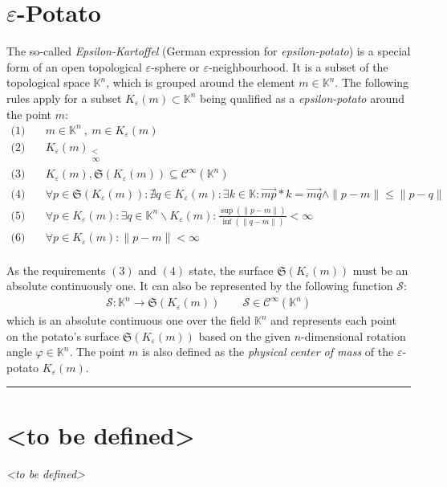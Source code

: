 \documentclass[pdftex,12pt,a4paper]{report}
\begin{document}
    \section{$ \varepsilon $-Potato}
    The so-called \emph{Epsilon-Kartoffel} (German expression for \emph{epsilon-potato}) is a special form of an open topological $\varepsilon$-sphere or $\varepsilon$-neighbourhood. It is a subset of the topological space $ \mathbb{K}^n $, which is grouped around the element $ m \in \mathbb{K}^n $. The following rules apply for a subset $ K_{\varepsilon}(m) \subset \mathbb{K}^n $ being qualified as a \emph{epsilon-potato} around the point $ m $:
    \\
    \begin{equation*}
        \begin{aligned}
            \text{(1)} \quad & m \in \mathbb{K}^n \ , \ m \in K_{\varepsilon}(m)
            \\
            \text{(2)} \quad & {K_{\varepsilon}(m)}_{\substack{ < \\ \infty }}
            \\
            \text{(3)} \quad & K_{\varepsilon}(m), \mathfrak{S}(K_{\varepsilon}(m)) \subseteq \mathcal{C}^\infty (\mathbb{K}^n)
            \\
            \text{(4)} \quad & \forall p \in \mathfrak{S}(K_{\varepsilon}(m)) : \nexists q \in K_{\varepsilon}(m) : \exists k \in \mathbb{K} : \vec{mp} * k = \vec{mq} \wedge \|p-m\| \leq \|p-q\|
            \\
            \text{(5)} \quad & \forall p \in K_{\varepsilon}(m) : \exists q \in \mathbb{K}^n \backslash K_{\varepsilon}(m) : \frac{\sup(\|p-m\|)}{\inf(\|q-m\|)} < \infty
            \\
            \text{(6)} \quad & \forall p \in K_{\varepsilon}(m) : \|p-m\| < \infty
        \end{aligned}
    \end{equation*}
    \\
    As the requirements $ (3) $ and $ (4) $ state, the surface $ \mathfrak{S}(K_{\varepsilon}(m)) $ must be an absolute continuously one. It can also be represented by the following function $ \mathcal{S} $:
    \begin{equation*}
        \begin{aligned}
            \mathcal{S} : \mathbb{K}^n \rightarrow \mathfrak{S}(K_{\varepsilon}(m)) \qquad \mathcal{S} \in \mathcal{C}^\infty (\mathbb{K}^n)
        \end{aligned}
    \end{equation*}
    which is an absolute continuous one over the field $ \mathbb{K}^n $ and represents each point on the potato's surface $ \mathfrak{S}(K_{\varepsilon}(m)) $ based on the given $ n $-dimensional rotation angle $ \varphi \in \mathbb{K}^n $.
    \newline
    The point $ m $ is also defined as the \emph{physical center of mass} of the $\varepsilon$-potato $ K_{\varepsilon}(m) $.
    \vspace{5mm} \hrule
    \section{<to be defined>}
    \textsl{<to be defined>}
\end{document}
